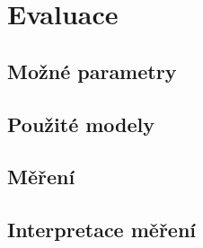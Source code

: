 \chapter{Evaluace}\label{chapter:evaluation}
\section{Možné parametry}
\section{Použité modely}
\section{Měření}
\section{Interpretace měření}
